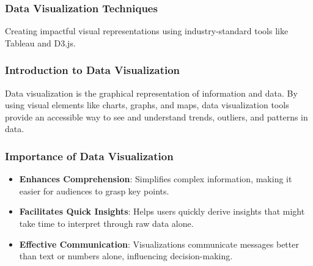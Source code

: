 \documentclass{beamer}
\begin{document}
\begin{frame}[fragile]
    \frametitle{Data Visualization Techniques}
    Creating impactful visual representations using industry-standard tools like Tableau and D3.js.
\end{frame}

\begin{frame}[fragile]
    \frametitle{Introduction to Data Visualization}
    Data visualization is the graphical representation of information and data. 
    By using visual elements like charts, graphs, and maps, data visualization tools provide an accessible way to see and understand trends, outliers, and patterns in data.
\end{frame}

\begin{frame}[fragile]
    \frametitle{Importance of Data Visualization}
    \begin{itemize}
        \item \textbf{Enhances Comprehension}: Simplifies complex information, making it easier for audiences to grasp key points.
        \item \textbf{Facilitates Quick Insights}: Helps users quickly derive insights that might take time to interpret through raw data alone.
        \item \textbf{Effective Communication}: Visualizations communicate messages better than text or numbers alone, influencing decision-making.
    \end{itemize}
\end{frame}
\end{document}
